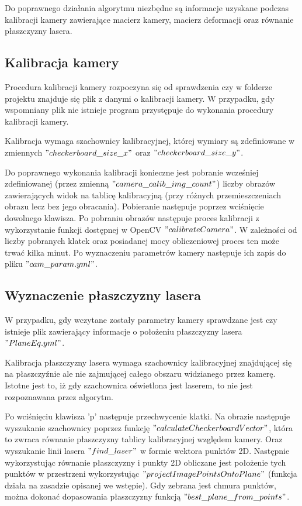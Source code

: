 \documentclass[conference]{IEEEtran}
\begin{document}
Do poprawnego działania algorytmu niezbędne są informacje uzyskane podczas kalibracji kamery zawierające macierz kamery, macierz deformacji oraz równanie płaszczyzny lasera.

\subsection{Kalibracja kamery}

Procedura kalibracji kamery rozpoczyna się od sprawdzenia czy w folderze projektu znajduje się plik z danymi o kalibracji kamery. W przypadku, gdy wspomniany plik nie istnieje program przystępuje do wykonania procedury kalibracji kamery.

Kalibracja wymaga szachownicy kalibracyjnej, której wymiary są zdefiniowane w zmiennych $"checkerboard\_size\_x"$ oraz $"checkerboard\_size\_y"$. 

Do poprawnego wykonania kalibracji konieczne jest pobranie wcześniej zdefiniowanej (przez zmienną $"camera\_calib\_img\_count"$) liczby obrazów zawierających widok na tablicę kalibracyjną (przy różnych przemieszczeniach obrazu lecz bez jego obracania). Pobieranie następuje poprzez wciśnięcie dowolnego klawisza. Po pobraniu obrazów następuje proces kalibracji z wykorzystanie funkcji dostępnej w OpenCV $"calibrateCamera"$. W zależności od liczby pobranych klatek oraz posiadanej mocy obliczeniowej proces ten może trwać kilka minut. Po wyznaczeniu parametrów kamery następuje ich zapis do pliku $"cam\_param.yml"$.

\subsection{Wyznaczenie płaszczyzny lasera}

W przypadku, gdy wczytane zostały parametry kamery sprawdzane jest czy istnieje plik zawierający informacje o położeniu płaszczyzny lasera $"PlaneEq.yml"$.

Kalibracja płaszczyzny lasera wymaga szachownicy kalibracyjnej znajdującej się na płaszczyźnie ale nie zajmującej całego obszaru widzianego przez kamerę. Istotne jest to, iż gdy szachownica oświetlona jest laserem, to nie jest rozpoznawana przez algorytm.

Po wciśnięciu klawisza 'p' następuje przechwycenie klatki. Na obrazie następuje wyszukanie szachownicy poprzez funkcję $"calculateCheckerboardVector"$, która to zwraca równanie płaszczyzny tablicy kalibracyjnej względem kamery. Oraz wyszukanie linii lasera $"find\_laser"$ w formie wektora punktów 2D. Następnie wykorzystując równanie płaszczyzny i punkty 2D obliczane jest położenie tych punktów w przestrzeni wykorzystując $"projectImagePointsOntoPlane"$ (funkcja działa na zasadzie opisanej we wstępie). Gdy zebrana jest chmura punktów, można dokonać dopasowania płaszczyzny funkcją $"best\_plane\_from\_points"$. 
\end{document}
